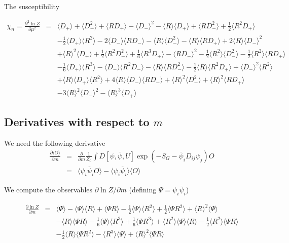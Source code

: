 \documentclass[a4paper,10pt]{report}
\newcommand{\ol}[1]{\overline{#1}}
\newcommand{\mv}[1]{\langle #1 \rangle}
\begin{document}
\noindent The susceptibility

\begin{eqnarray}
\chi_n = \frac{\partial^2 \ln Z}{\partial \mu^2} &=& 
  \mv{D_+} + \mv{D^2_-} + \mv{RD_+} - \mv{D_-}^2 - \mv{R}\mv{D_+} + \mv{RD^2_-} + \frac{1}{2}\mv{R^2D_+}\nonumber \\
  && - \frac{1}{2}\mv{D_+}\mv{R^2}
     - 2\mv{D_-}\mv{RD_-} - \mv{R}\mv{D^2_-} - \mv{R}\mv{RD_+} + 2 \mv{R}\mv{D_-}^2   \nonumber \\
 && + \mv{R}^2\mv{D_+} + \frac{1}{2}\mv{R^2D_-^2} + \frac{1}{6}\mv{R^3D_+}
    - \mv{RD_-}^2 - \frac{1}{2}\mv{R^2}\mv{D^2_-} - \frac{1}{2}\mv{R^2}\mv{RD_+}   \nonumber \\
 && - \frac{1}{6}\mv{D_+}\mv{R^3} - \mv{D_-}\mv{R^2D_-} - \mv{R}\mv{RD_-^2} 
    - \frac{1}{2}\mv{R}\mv{R^2D_+} + \mv{D_-}^2\mv{R^2}    \nonumber \\
 &&  + \mv{R}\mv{D_+}\mv{R^2} + 4 \mv{R}\mv{D_-}\mv{RD_-} + \mv{R}^2\mv{D_-^2} + \mv{R}^2\mv{RD_+}   \nonumber \\
 &&  - 3 \mv{R}^2\mv{D_-}^2 - \mv{R}^3\mv{D_+}
\end{eqnarray}

\newpage
\subsection*{Derivatives with respect to $m$}

\noindent We need the following derivative
\begin{eqnarray}
\frac{\partial \mv{O}}{\partial m} &=& 
  \frac{\partial}{\partial m} \frac{1}{Z_0} \int D[\psi,\ol{\psi},U]\exp(-S_G - \ol{\psi}_i D_{ij} \psi_j) O \nonumber\\
  &=& \mv{\psi_i \ol{\psi}_i O} -  \mv{\psi_i \ol{\psi}_i}\mv{O}
\end{eqnarray}

\noindent We compute the observables $\partial \ln Z / \partial m$ (defining $\Psi= \psi_i \ol{\psi}_i$)

\begin{eqnarray}
\frac{\partial \ln Z}{\partial m} &=& 
  \mv{\Psi} - \mv{\Psi}\mv{R} + \mv{\Psi R} - \frac{1}{2}\mv{\Psi}\mv{R^2} + \frac{1}{2}\mv{\Psi R^2} 
   + \mv{R}^2\mv{\Psi}  \nonumber\\ 
   && - \mv{R}\mv{\Psi R} - \frac{1}{6}\mv{\Psi}\mv{R^3}  + \frac{1}{6}\mv{\Psi R^3}
  + \mv{R^2}\mv{\Psi}\mv{R} - \frac{1}{2}\mv{R^2}\mv{\Psi R} \nonumber \\
  && - \frac{1}{2}\mv{R}\mv{\Psi R^2}
  - \mv{R^3}\mv{\Psi} + \mv{R}^2\mv{\Psi R}
\end{eqnarray}
\end{document}
